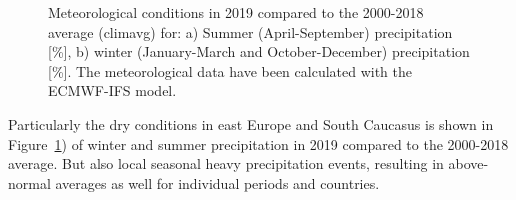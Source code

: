 \begin{figure}[H]
  \caption{Meteorological conditions in 2019 compared to the 2000-2018 average (climavg) for: a) Summer (April-September) precipitation [\%], b) winter (January-March and October-December) precipitation [\%]. The meteorological data have been calculated with the ECMWF-IFS model.} 
\label{fig:prec-avMET}
\end{figure}

Particularly the dry conditions in east Europe and South Caucasus is shown in Figure~\ref{fig:prec-avMET}) of winter and summer precipitation in 2019 compared to the 2000-2018 average. But also local seasonal heavy precipitation events, resulting in above-normal averages as well for individual periods and countries. 

